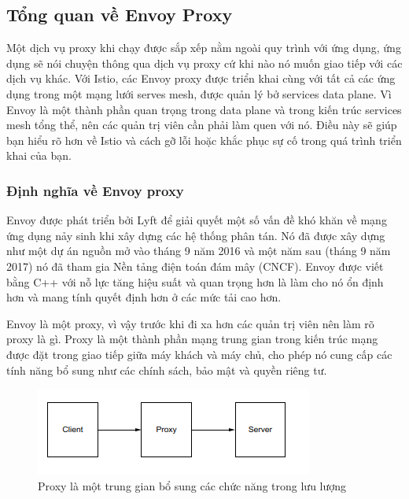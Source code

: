 \documentclass[12pt,a4paper]{report}
\begin{document}
		\subsection{Tổng quan về Envoy Proxy}
		\hspace{0.6cm}Một dịch vụ proxy khi chạy được sắp xếp nằm ngoài quy trình với ứng dụng, ứng dụng sẽ nói chuyện thông qua dịch vụ proxy cứ khi nào nó muốn giao tiếp với các dịch vụ khác. Với Istio, các Envoy proxy được triển khai cùng với tất cả các ứng dụng trong một mạng lưới serves mesh, được quản lý bở services data plane. Vì Envoy là một thành phần quan trọng trong data plane và trong kiến trúc services mesh tổng thể, nên các quản trị viên cần phải làm quen với nó. Điều này sẽ giúp bạn hiểu rõ hơn về Istio và cách gỡ lỗi hoặc khắc phục sự cố trong quá trình triển khai của bạn.
			\subsubsection{Định nghĩa về Envoy proxy}
		\hspace{0.6cm}Envoy được phát triển bởi Lyft để giải quyết một số vấn đề khó khăn về mạng ứng dụng nảy sinh khi xây dựng các hệ thống phân tán. Nó đã được xây dựng như một dự án nguồn mở vào tháng 9 năm 2016 và một năm sau (tháng 9 năm 2017) nó đã tham gia Nền tảng điện toán  đám mây (CNCF). Envoy được viết bằng C++ với nỗ lực tăng hiệu suất và quan trọng hơn là làm cho nó ổn định hơn và mang tính quyết định hơn ở các mức tải cao hơn.
		
		Envoy là một proxy, vì vậy trước khi đi xa hơn các quản trị viên nên làm rõ proxy là gì. Proxy là một thành phần mạng trung gian trong kiến trúc mạng được đặt trong giao tiếp giữa máy khách và máy chủ, cho phép nó cung cấp các tính năng bổ sung như các chính sách, bảo mật và quyền riêng tư.
		
		\begin{figure}[h]
			\centering
			\includegraphics[width=0.7\linewidth]{Pics/2.1.3-p1}
			\caption{Proxy là một trung gian bổ sung các chức năng trong lưu lượng}
			\label{fig:2.1.3-1}
		\end{figure}
		
\end{document}
